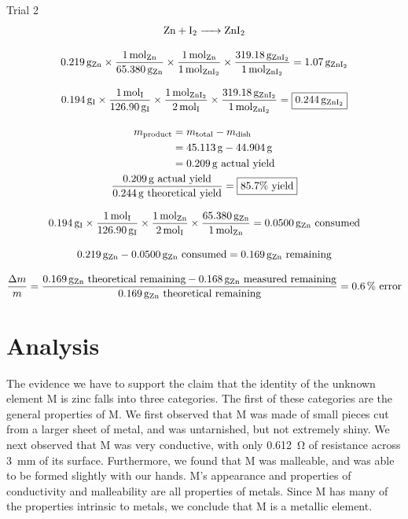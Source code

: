 \documentclass[titlepage]{article}
\begin{document}
\large{Trial 2}
\begin{gather*}
    \ce{Zn + I2 -> ZnI2} \\[2ex]
    \qty{0.219}{\gram\of{Zn}}\times\frac{\qty{1}{\mol\of{Zn}}}{\qty{65.380}{\gram\of{Zn}}}\times\frac{\qty{1}{\mol\of{Zn}}}{\qty{1}{\mol\of{\ce{ZnI2}}}}\times\frac{\qty{319.18}{\gram\of{\ce{ZnI2}}}}{\qty{1}{\mol\of{\ce{ZnI2}}}}=\qty{1.07}{\gram\of{\ce{ZnI2}}} \\[2ex]
    \qty{0.194}{\gram\of{I}}\times\frac{\qty{1}{\mol\of{I}}}{\qty{126.90}{\gram\of{I}}}\times\frac{\qty{1}{\mol\of{\ce{ZnI2}}}}{\qty{2}{\mol\of{I}}}\times\frac{\qty{319.18}{\gram\of{\ce{ZnI2}}}}{\qty{1}{\mol\of{\ce{ZnI2}}}}=\boxed{\qty{0.244}{\gram\of{\ce{ZnI2}}}} \\[2ex]
    \begin{split}
    m_{\text{product}} &= m_{\text{total}} - m_{\text{dish}} \\
                       &= \qty{45.113}{\gram} - \qty{44.904}{\gram} \\
                       &= \qty{0.209}{\gram} \text{ actual yield} \\
    \end{split} \\
    \frac{\qty{0.209}{\gram}\mathrm{\ actual\ yield}}{\qty{0.244}{\gram}\mathrm{\ theoretical\ yield}}=\boxed{85.7\unit{\percent}\mathrm{\ yield}} \\[2ex]
    \qty{0.194}{\gram\of{I}}\times\frac{\qty{1}{\mol\of{I}}}{\qty{126.90}{\gram\of{I}}}\times\frac{\qty{1}{\mol\of{Zn}}}{\qty{2}{\mol\of{I}}}\times\frac{\qty{65.380}{\gram\of{Zn}}}{\qty{1}{\mol\of{Zn}}}=\qty{0.0500}{\gram\of{Zn}}\text{ consumed} \\[2ex]
    \qty{0.219}{\gram\of{Zn}}-\qty{0.0500}{\gram\of{Zn}}\text{ consumed}=\qty{0.169}{\gram\of{Zn}}\text{ remaining} \\[2ex]
    \frac{\Delta m}{m}=\frac{\qty{0.169}{\gram\of{Zn}}\text{ theoretical remaining}-\qty{0.168}{\gram\of{Zn}}\text{ measured remaining}}{\qty{0.169}{\gram\of{Zn}}\text{ theoretical remaining}}=\qty{0.6}{\percent}\text{ error}
\end{gather*}

\section{Analysis}

The evidence we have to support the claim that the identity of the unknown element M is zinc falls into three categories. The first of these categories are the general properties of M. We first observed that M was made of small pieces cut from a larger sheet of metal, and was untarnished, but not extremely shiny. We next observed that M was very conductive, with only \qty{0.612}{\ohm} of resistance across \qty{3}{\milli\meter} of its surface. Furthermore, we found that M was malleable, and was able to be formed slightly with our hands. M's appearance and properties of conductivity and malleability are all properties of metals. Since M has many of the properties intrinsic to metals, we conclude that M is a metallic element. 
\end{document}
